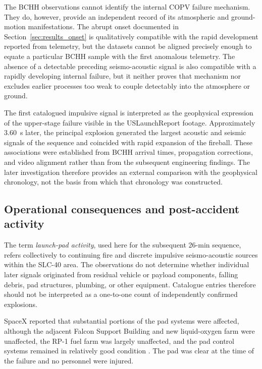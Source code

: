 \documentclass[]{seismica}
\begin{document}
The BCHH observations cannot identify the internal COPV failure mechanism.
They do, however, provide an independent record of its atmospheric and
ground-motion manifestations. The abrupt onset documented in
Section~\ref{sec:results_onset} is qualitatively compatible with the rapid
development reported from telemetry, but the datasets cannot be aligned
precisely enough to equate a particular BCHH sample with the first anomalous
telemetry. The absence of a detectable preceding seismo-acoustic signal is
also compatible with a rapidly developing internal failure, but it neither
proves that mechanism nor excludes earlier processes too weak to couple
detectably into the atmosphere or ground.

The first catalogued impulsive signal is interpreted as the geophysical
expression of the upper-stage failure visible in the USLaunchReport footage.
Approximately 3.60~s later, the principal explosion generated the largest
acoustic and seismic signals of the sequence and coincided with rapid expansion
of the fireball. These associations were established from BCHH arrival times,
propagation corrections, and video alignment rather than from the subsequent
engineering findings. The later investigation therefore provides an external
comparison with the geophysical chronology, not the basis from which that
chronology was constructed.


\subsection{Operational consequences and post-accident activity}
\label{sec:discussion_operational_consequences}

The term \emph{launch-pad activity}, used here for the subsequent 26-min
sequence, refers collectively to continuing fire and discrete impulsive
seismo-acoustic sources within the SLC-40 area. The observations do not
determine whether individual later signals originated from residual vehicle or
payload components, falling debris, pad structures, plumbing, or other
equipment. Catalogue entries therefore should not be interpreted as a
one-to-one count of independently confirmed explosions.

SpaceX reported that substantial portions of the pad systems were affected,
although the adjacent Falcon Support Building and new liquid-oxygen farm were
unaffected, the RP-1 fuel farm was largely unaffected, and the pad control
systems remained in relatively good condition
\citep{spacex_anomaly_2017}. The pad was clear at the time of the failure and
no personnel were injured.
\end{document}
